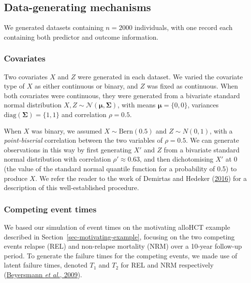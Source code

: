 \documentclass[
  letterpaper,
  DIV=11,
  numbers=noendperiod]{scrreprt}
\begin{document}
\hypertarget{data-generating-mechanisms}{%
\subsection{Data-generating
mechanisms}\label{data-generating-mechanisms}}

We generated datasets containing \(n = 2000\) individuals, with one
record each containing both predictor and outcome information.

\hypertarget{covariates}{%
\subsubsection{Covariates}\label{covariates}}

Two covariates \(X\) and \(Z\) were generated in each dataset. We varied
the covariate type of \(X\) as either continuous or binary, and \(Z\)
was fixed as continuous. When both covariates were continuous, they were
generated from a bivariate standard normal distribution
\(X,Z \sim \mathcal{N}(\boldsymbol{\mu}, \boldsymbol{\Sigma})\), with
means \(\boldsymbol{\mu} = \{0, 0\}\), variances
\(\text{diag}(\boldsymbol{\Sigma}) = \{1, 1\}\) and correlation
\(\rho = 0.5\).

When \(X\) was binary, we assumed \(X \sim \text{Bern}(0.5)\) and
\(Z \sim N(0, 1)\), with a \emph{point-biserial} correlation between the
two variables of \(\rho = 0.5\). We can generate observations in this
way by first generating \(X'\) and \(Z\) from a bivariate standard
normal distribution with correlation \(\rho' \approx 0.63\), and then
dichotomising \(X'\) at 0 (the value of the standard normal quantile
function for a probability of 0.5) to produce \(X\). We refer the reader
to the work of Demirtas and Hedeker
(\protect\hyperlink{ref-demirtasComputingPointbiserialCorrelation2016}{2016})
for a description of this well-established procedure.

\hypertarget{competing-event-times}{%
\subsubsection{Competing event times}\label{competing-event-times}}

We based our simulation of event times on the motivating alloHCT example
described in Section~\ref{sec-motivating-example}, focusing on the two
competing events relapse (REL) and non-relapse mortality (NRM) over a
10-year follow-up period. To generate the failure times for the
competing events, we made use of latent failure times, denoted \(T_1\)
and \(T_2\) for REL and NRM respectively
(\protect\hyperlink{ref-beyersmannSimulatingCompetingRisks2009}{Beyersmann
\emph{et al.}, 2009}).
\end{document}
